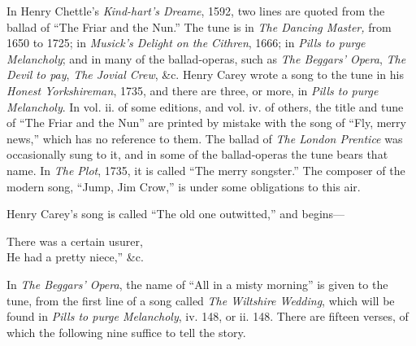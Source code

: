


In Henry Chettle’s \textit{Kind-hart's Dreame}, 1592, two lines are quoted from the
ballad of “The Friar and the Nun.” The tune is in \textit{The Dancing Master,} from
1650 to 1725; in \textit{Musick's Delight on the Cithren}, 1666; in \textit{Pills to purge
Melancholy}; and in many of the ballad-operas, such as \textit{The Beggars' Opera}, \textit{The
Devil to pay}, \textit{The Jovial Crew}, \&c. Henry Carey wrote a song to the tune in his
\textit{Honest Yorkshireman}, 1735, and there are three, or more, in \textit{Pills to purge Melancholy}.
 In vol. ii. of some editions, and vol. iv. of others, the title and tune of
“The Friar and the Nun” are printed by mistake with the song of “Fly, merry 
news,” which has no reference to them. \pagebreak The ballad of \textit{The London Prentice} was
occasionally sung to it, and in some of the ballad-operas the tune bears that name.
In \textit{The Plot}, 1735, it is called “The merry songster.” The composer of the
modern song, “Jump, Jim Crow,” is under some obligations to this air.

Henry Carey’s song is called “The old one outwitted,” and begins—
\begin{scverse}
\begin{altverse}
There was a certain usurer,\\
He had a pretty niece,” \&c.
\end{altverse}
\end{scverse}

In \textit{The Beggars’ Opera}, the name of “All in a misty morning” is given to
the tune, from the first line of a song called \textit{The Wiltshire Wedding}, which will
be found in \textit{Pills to purge Melancholy}, iv. 148, or ii. 148. There are fifteen
verses, of which the following nine suffice to tell the story.


\vspace{-2\baselineskip}


